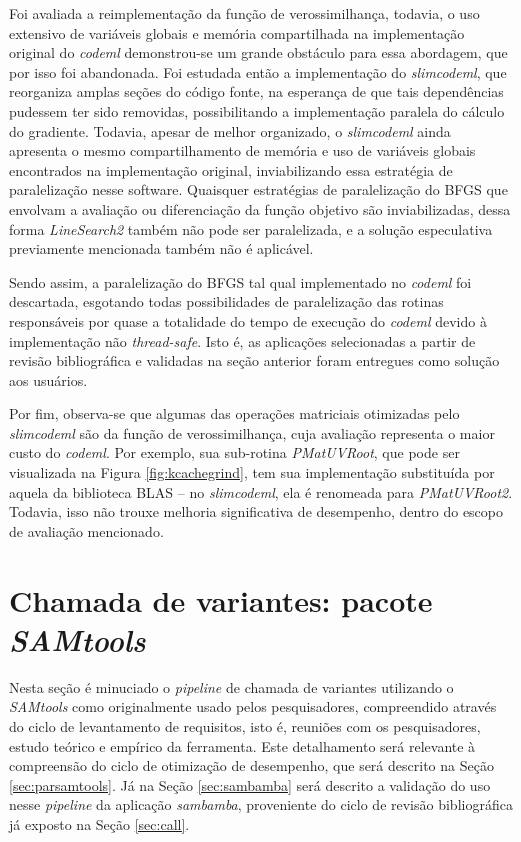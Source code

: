 \documentclass[cic,tc]{iiufrgs}
\begin{document}
Foi avaliada a reimplementação da função de verossimilhança, todavia, o
uso extensivo de variáveis globais e memória compartilhada na implementação
original do \textit{codeml} demonstrou-se um grande obstáculo para essa abordagem, que
por isso foi abandonada. Foi estudada então a implementação do \textit{slimcodeml}, que
reorganiza amplas seções do código fonte, na esperança de que tais
dependências pudessem ter sido removidas, possibilitando a implementação
paralela do cálculo do gradiente. Todavia, apesar de melhor organizado, o
\textit{slimcodeml} ainda apresenta o mesmo compartilhamento de memória e uso de
variáveis globais encontrados na implementação original, inviabilizando essa
estratégia de paralelização nesse software. Quaisquer estratégias de
paralelização do BFGS que envolvam a avaliação ou diferenciação da função
objetivo são inviabilizadas, dessa forma \textit{LineSearch2} também não pode
ser paralelizada, e a solução especulativa previamente mencionada também não é
aplicável.

Sendo assim, a paralelização do BFGS tal qual implementado no \textit{codeml} foi
descartada, esgotando todas possibilidades de paralelização das rotinas
responsáveis por quase a totalidade do tempo de execução do \textit{codeml} devido à
implementação não \textit{thread-safe}. Isto é, as aplicações selecionadas a
partir de revisão bibliográfica e validadas na seção anterior foram entregues
como solução aos usuários.

Por fim, observa-se que algumas das operações matriciais otimizadas pelo
\textit{slimcodeml} são da função de verossimilhança, cuja avaliação representa
o maior custo do \textit{codeml}. Por exemplo, sua sub-rotina
\textit{PMatUVRoot}, que pode ser visualizada na Figura \ref{fig:kcachegrind},
tem sua implementação substituída por aquela da biblioteca BLAS -- no
\textit{slimcodeml}, ela é renomeada para \textit{PMatUVRoot2}. Todavia, isso
não trouxe melhoria significativa de desempenho, dentro do escopo de avaliação
mencionado.

\section{Chamada de variantes: pacote \textit{SAMtools}}
\label{sec:SAMtools}

Nesta seção é minuciado o \textit{pipeline} de chamada de variantes utilizando
o \textit{SAMtools} como originalmente usado pelos pesquisadores, compreendido
através do ciclo de levantamento de requisitos, isto é, reuniões com os
pesquisadores, estudo teórico e empírico da ferramenta. Este detalhamento será
relevante à compreensão do ciclo de otimização de desempenho, que será descrito
na Seção \ref{sec:parsamtools}.  Já na Seção \ref{sec:sambamba} será descrito a
validação do uso nesse \textit{pipeline} da aplicação \textit{sambamba},
proveniente do ciclo de revisão bibliográfica já exposto na Seção
\ref{sec:call}.
\end{document}
